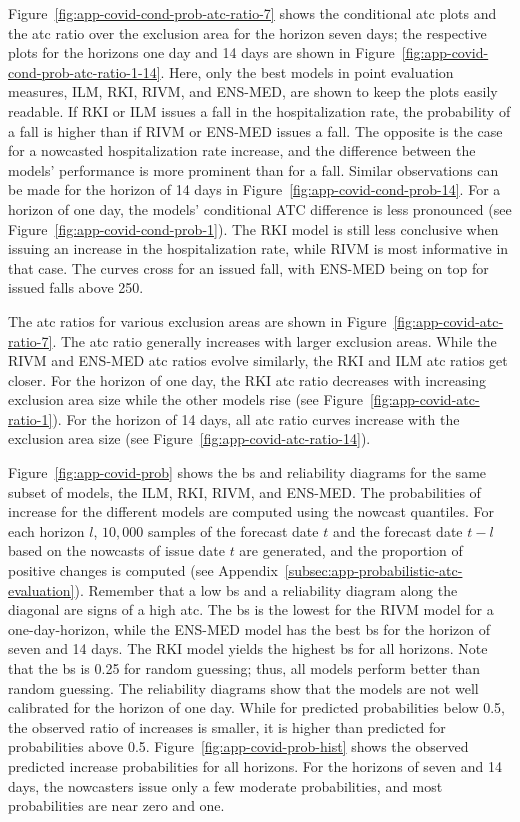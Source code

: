\documentclass[pdflatex]{sn-jnl}
\theoremstyle{plain}%
\theoremstyle{definition}
\begin{document}
Figure~\ref{fig:app-covid-cond-prob-atc-ratio-7} shows the conditional \ac{atc} plots and the \ac{atc} ratio over the exclusion area for the horizon seven days; the respective plots for the horizons one day and 14 days are shown in Figure~\ref{fig:app-covid-cond-prob-atc-ratio-1-14}.
Here, only the best models in point evaluation measures, ILM, RKI, RIVM, and ENS-MED, are shown to keep the plots easily readable.
If RKI or ILM issues a fall in the hospitalization rate, the probability of a fall is higher than if RIVM or ENS-MED issues a fall.
The opposite is the case for a nowcasted hospitalization rate increase, and the difference between the models' performance is more prominent than for a fall.
Similar observations can be made for the horizon of 14 days in Figure~\ref{fig:app-covid-cond-prob-14}.
For a horizon of one day, the models' conditional ATC difference is less pronounced (see Figure~\ref{fig:app-covid-cond-prob-1}).
The RKI model is still less conclusive when issuing an increase in the hospitalization rate, while RIVM is most informative in that case.
The curves cross for an issued fall, with ENS-MED being on top for issued falls above 250.

The \ac{atc} ratios for various exclusion areas are shown in Figure~\ref{fig:app-covid-atc-ratio-7}.
The \ac{atc} ratio generally increases with larger exclusion areas.
While the RIVM and ENS-MED \ac{atc} ratios evolve similarly, the RKI and ILM \ac{atc} ratios get closer.
For the horizon of one day, the RKI \ac{atc} ratio decreases with increasing exclusion area size while the other models rise (see Figure~\ref{fig:app-covid-atc-ratio-1}).
For the horizon of 14 days, all \ac{atc} ratio curves increase with the exclusion area size (see Figure~\ref{fig:app-covid-atc-ratio-14}).

Figure~\ref{fig:app-covid-prob} shows the \acf{bs} and reliability diagrams for the same subset of models, the ILM, RKI, RIVM, and ENS-MED.
The probabilities of increase for the different models are computed using the nowcast quantiles.
For each horizon $l$, $10,000$ samples of the forecast date $t$ and the forecast date $t-l$ based on the nowcasts of issue date $t$ are generated, and the proportion of positive changes is computed (see Appendix~\ref{subsec:app-probabilistic-atc-evaluation}).
Remember that a low \ac{bs} and a reliability diagram along the diagonal are signs of a high \ac{atc}.
The \ac{bs} is the lowest for the RIVM model for a one-day-horizon, while the ENS-MED model has the best \ac{bs} for the horizon of seven and 14 days.
The RKI model yields the highest \ac{bs} for all horizons.
Note that the \ac{bs} is 0.25 for random guessing; thus, all models perform better than random guessing.
The reliability diagrams show that the models are not well calibrated for the horizon of one day.
While for predicted probabilities below 0.5, the observed ratio of increases is smaller, it is higher than predicted for probabilities above 0.5.
Figure~\ref{fig:app-covid-prob-hist} shows the observed predicted increase probabilities for all horizons.
For the horizons of seven and 14 days, the nowcasters issue only a few moderate probabilities, and most probabilities are near zero and one.
\end{document}
